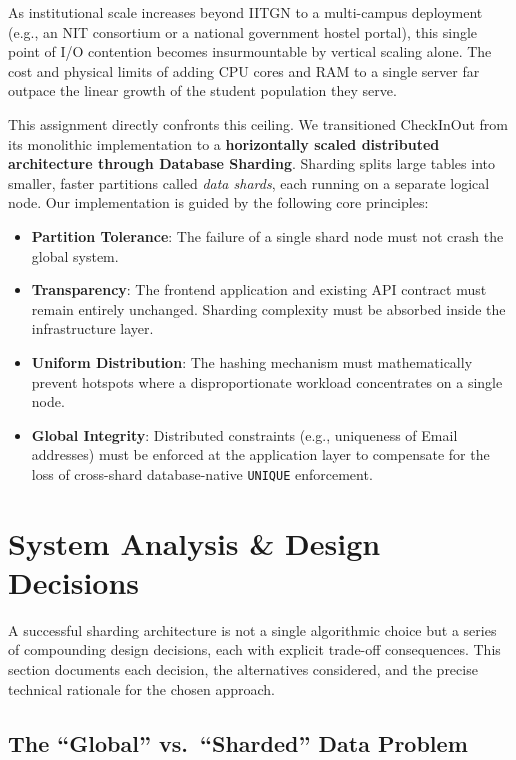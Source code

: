 \documentclass[sigconf]{acmart}
\begin{document}
As institutional scale increases beyond IITGN to a multi-campus deployment (e.g., an NIT consortium or a national government hostel portal), this single point of I/O contention becomes insurmountable by vertical scaling alone. The cost and physical limits of adding CPU cores and RAM to a single server far outpace the linear growth of the student population they serve.

This assignment directly confronts this ceiling. We transitioned CheckInOut from its monolithic implementation to a \textbf{horizontally scaled distributed architecture through Database Sharding}. Sharding splits large tables into smaller, faster partitions called \textit{data shards}, each running on a separate logical node. Our implementation is guided by the following core principles:

\begin{itemize}[leftmargin=*]
    \item \textbf{Partition Tolerance}: The failure of a single shard node must not crash the global system.
    \item \textbf{Transparency}: The frontend application and existing API contract must remain entirely unchanged. Sharding complexity must be absorbed inside the infrastructure layer.
    \item \textbf{Uniform Distribution}: The hashing mechanism must mathematically prevent hotspots where a disproportionate workload concentrates on a single node.
    \item \textbf{Global Integrity}: Distributed constraints (e.g., uniqueness of Email addresses) must be enforced at the application layer to compensate for the loss of cross-shard database-native \texttt{UNIQUE} enforcement.
\end{itemize}

\section{System Analysis \& Design Decisions}

A successful sharding architecture is not a single algorithmic choice but a series of compounding design decisions, each with explicit trade-off consequences. This section documents each decision, the alternatives considered, and the precise technical rationale for the chosen approach.

\subsection{The ``Global'' vs.\ ``Sharded'' Data Problem}
\end{document}
